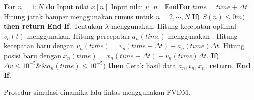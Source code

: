 \begin{algorithm}
 \begin{algorithmic}[1]
    \State {}
	\State \textbf{For }$n=1:N$\textbf{ do} 
	\State \hspace{0.5cm} Input nilai $x[n]$
	\State \hspace{0.5cm} Input nilai $v[n]$
	\State \textbf{EndFor}
	\State {}
	\State \hspace{0.5cm} $time=time +\Delta t$
	\State \hspace{0.5cm} Hitung jarak bamper menggunakan rumus  untuk $n=2,\cdots,N$ 
	\State \hspace{0.5cm} \textbf{If}( $S(n) \leq 0 m)$ \textbf{then return End If}.
	\State \hspace{0.5cm} Tentukan $\lambda$ menggunakan.
	\State \hspace{0.5cm} Hitung kecepatan optimal $v_o(t)$ menggunakan.
	\State \hspace{0.5cm} Hitung percepatan $a_n(time)$ menggunakan .
	\State \hspace{0.5cm} Hitung kecepatan baru dengan $v_n(time)=v_n(time-\Delta t) + a_n(time) \Delta t$.
	\State \hspace{0.5cm} Hitung posisi baru dengan $x_n(time)=x_n(time-\Delta t) + v_n(time) \Delta t$.
	\State \hspace{0.5cm} \textbf{If}( $\Delta v \leq 10^{-5} \&\& a_n(time)\leq 10^{-5})$ \textbf{then}  
    \State \hspace{0.5cm} \hspace{0.5cm} Cetak hasil data $a_n, v_n, x_n$.
	\State \hspace{0.5cm} \hspace{0.5cm} \textbf{return}.
	\State \hspace{0.5cm} \textbf{End If}.
	\EndWhile
	\State {}
 \EndProcedure
 \end{algorithmic}
 \caption{Prosedur simulasi dinamika lalu lintas menggunakan FVDM.}\label{Algo:FVDM}
\end{algorithm}